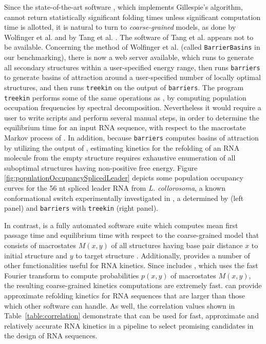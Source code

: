 Since the state-of-the-art software \kinfold, which implements
Gillespie's algorithm, cannot return statistically significant folding
times unless significant computation time is allotted, it is natural
to turn to {\em coarse-grained} models, as done by
Wolfinger et al. \citep{wolfingerStadler:kinetics} and by
Tang et al. \citep{Tang.jmb08}.  The software of Tang et al. appears not
to be available. Concerning the
method of Wolfinger et al. (called {\tt BarrierBasins} in our benchmarking),
there is now a web server available, which runs \rnasub
\citep{Wuchty.b99} to generate all secondary structures within a user-specified
energy range, then runs {\tt barriers} \citep{flammHofacker} to generate
basins of attraction around a user-specified number of locally optimal
structures, and then runs {\tt treekin} on the output of {\tt barriers}.
The program {\tt treekin} performs some of the same operations as \hermes,
by computing population occupation frequencies by spectral decomposition.
Nevertheless it would require a user to write scripts and perform
several manual steps, in order to determine the equilibrium time for
an input RNA sequence, with respect to the macrostate Markov process
of \citep{wolfingerStadler:kinetics}. In addition, because {\tt barriers} computes
basins of attraction by utilizing the output of \rnasub, estimating kinetics for the
refolding of an RNA molecule from the empty structure requires exhaustive enumeration
of all suboptimal structures having non-positive free energy.
Figure \ref{fig:populationOccupancySplicedLeader} depicts some population
occupancy curves for the 56 nt spliced leader RNA from
{\em L. collorosoma}, a known conformational switch experimentally
investigated in \citep{lecuyerCrothers}, a determined by
\hermes (left panel) and {\tt barriers} with {\tt treekin}
(right panel).

In contrast, \hermes is a fully automated software suite which
computes mean first passage time and equilibrium time with respect to
the coarse-grained model that consists of macrostates $M(x,y)$ of all
structures having base pair distance $x$ to initial structure \strA and
$y$ to target structure \strB. Additionally, \hermes provides
a number of other functionalities useful for RNA kinetics. Since
\hermes includes \ffttwo, which uses the fast Fourier transform
to compute probabilities $p(x,y)$ of macrostates $M(x,y)$, the resulting
coarse-grained kinetics computations are extremely fast. \hermes
can provide approximate refolding kinetics for RNA sequences that are
larger than those which other software can handle. As well, the
correlation values shown in Table~\ref{table:correlation}
demonstrate that \hermes can be used for fast, approximate and relatively
accurate RNA kinetics in a pipeline to select promising candidates in
the design of RNA sequences.


